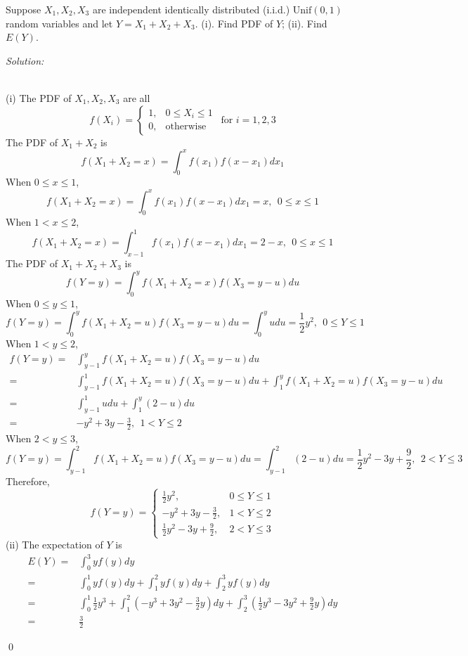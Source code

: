 \documentclass[12pt]{article}
\newenvironment{problem}[2][Problem]{\begin{trivlist}
\item[\hskip \labelsep {\bfseries #1}\hskip \labelsep {\bfseries #2.}]}{\end{trivlist}}
\newenvironment{sol}
    {\emph{Solution:}
    }
    {
    \qed
    }
\begin{document}
\begin{problem}{7}
Suppose $X_1, X_2,X_3$ are independent identically distributed (i.i.d.) $\text{Unif}(0,1)$ random variables and let $Y=X_1+X_2+X_3$. (i). Find PDF of $Y$; (ii). Find $E(Y)$.
\end{problem}
\begin{sol}
\\(i) The PDF of $X_1,X_2,X_3$ are all
\[
f(X_i)=
\left\{\begin{array}{ll}
1,&0\leq X_i\leq1\\
0,&\text{otherwise}
\end{array}\right.
~~\text{for }i=1,2,3
\]
The PDF of $X_1+X_2$ is
\[
f(X_1+X_2=x)=\int_0^xf(x_1)f(x-x_1)dx_1
\]
When $0\leq x\leq1$,
\[
f(X_1+X_2=x)=\int_0^xf(x_1)f(x-x_1)dx_1=x,~~0\leq x\leq1
\]
When $1<x\leq2$,
\[
f(X_1+X_2=x)=\int_{x-1}^1f(x_1)f(x-x_1)dx_1=2-x,~~0\leq x\leq1
\]
The PDF of $X_1+X_2+X_3$ is
\[
f(Y=y)=\int_0^yf(X_1+X_2=x)f(X_3=y-u)du
\]
When $0\leq y\leq1$,
\[
f(Y=y)=\int_0^yf(X_1+X_2=u)f(X_3=y-u)du=\int_0^yudu=\frac{1}{2}y^2,~~0\leq Y\leq1
\]
When $1<y\leq2$,
\begin{align*}
f(Y=y)=&\int_{y-1}^yf(X_1+X_2=u)f(X_3=y-u)du\\
=&\int_{y-1}^1f(X_1+X_2=u)f(X_3=y-u)du+\int_1^yf(X_1+X_2=u)f(X_3=y-u)du\\
=&\int_{y-1}^1udu+\int_1^y(2-u)du\\
=&-y^2+3y-\frac{3}{2},~~1<Y\leq2
\end{align*}
When $2<y\leq3$,
\[
f(Y=y)=\int_{y-1}^2f(X_1+X_2=u)f(X_3=y-u)du=\int_{y-1}^2(2-u)du=\frac{1}{2}y^2-3y+\frac{9}{2},~~2<Y\leq3
\]
Therefore,
\[
f(Y=y)=
\left\{\begin{array}{ll}
\frac{1}{2}y^2,&0\leq Y\leq1\\
-y^2+3y-\frac{3}{2},&1<Y\leq2\\
\frac{1}{2}y^2-3y+\frac{9}{2},&2<Y\leq3
\end{array}\right.
\]
(ii) The expectation of $Y$ is
\begin{align*}
E(Y)=&\int_0^3yf(y)dy\\
=&\int_0^1yf(y)dy+\int_1^2yf(y)dy+\int_2^3yf(y)dy\\
=&\int_0^1\frac{1}{2}y^3+\int_1^2(-y^3+3y^2-\frac{3}{2}y)dy+\int_2^3(\frac{1}{2}y^3-3y^2+\frac{9}{2}y)dy\\
=&\frac{3}{2}
\end{align*}
\end{sol}
\end{document}
